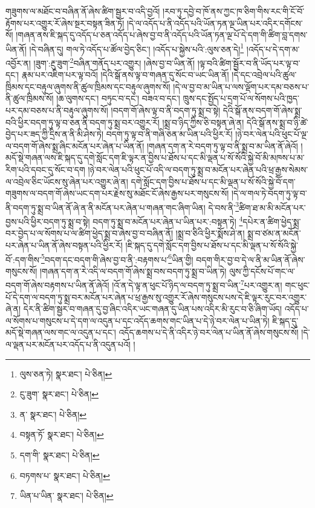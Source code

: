 གཟུགས་ལ་མཐོང་བ་བཞིན་ནོ་ཞེས་ཚིག་སྦྱར་བ་འདི་བྱའོ། །རབ་ཏུ་དབྱེ་བ་ཁོ་ནས་ཀྱང་ཁ་ཅིག་གིས་རང་གི་ངོ་བོ་རྟོགས་པར་འགྱུར་རོ་ཞེས་སྔར་བསྟན་ཟིན་ཏོ། །དེ་ལ་འདོད་པ་ནི་འདོད་པའི་ཡོན་ཏན་ལྔ་ཡིན་པར་འདིར་དགོངས་སོ། །གཞན་ནས་ཇི་སྐད་དུ་འདོད་པ་ཅན་འདོད་པ་ཞེས་བྱ་བ་ནི་འདོད་པའི་ཡོན་ཏན་ལྔ་པོ་དེ་དག་གི་ཚིག་བླ་དགས་ཡིན་ནོ། །དེ་བཞིན་དུ། གལ་ཏེ་འདོད་པ་ཚོལ་བྱེད་ཅིང་། །འདོད་པ་སྐྱེས་པའི་:ལུས་ཅན་དེ།\footnote{ལུས་ཅན་ཏེ།  སྣར་ཐང་།  པེ་ཅིན། } །འདོད་པ་དེ་དག་མ་འབྱོར་ན། །ཟུག་:རྔུ་ཟུག་\footnote{ངུ་ཟུག་  སྣར་ཐང་།  པེ་ཅིན། }བཞིན་གནོད་པར་འགྱུར། །ཞེས་བྱ་བ་ཡིན་ནོ། །ལྟ་བའི་ཚིག་སྦྱོར་བ་ནི་ཡོད་པར་ལྟ་བ་དང་། རྣམ་པར་འཇིག་པར་ལྟ་བའོ། །དེའི་སྒོ་ནས་ལྟ་བ་གཞན་དུ་སོང་བ་ཡང་ཡིན་ནོ། །དེ་དང་འབྲེལ་པའི་ཚུལ་ཁྲིམས་དང་བརྟུལ་ཞུགས་ནི་ཚུལ་ཁྲིམས་དང་བརྟུལ་ཞུགས་སོ། །དེ་ལ་བྱ་བ་མ་ཡིན་པ་ལས་ལྡོག་པར་དམ་བཅས་པ་ནི་ཚུལ་ཁྲིམས་སོ། །ཆ་ལུགས་དང་། བཏུང་བ་དང་། བཟའ་བ་དང་། ཁྲུས་དང་སྤྱོད་པ་དྲག་པོ་ལ་སོགས་པའི་ཁྱད་པར་དམ་བཅས་པ་ནི་བརྟུལ་ཞུགས་སོ། །བདག་གོ་ཞེས་ལྟ་བ་ནི་བདག་ཏུ་སྨྲ་བ་སྟེ། དེའི་སྒོ་ནས་བདག་གོ་ཞེས་སྨྲ་བའི་ཕྱིར་བདག་ཏུ་ལྟ་བ་ཅན་ནི་བདག་ཏུ་སྨྲ་བར་འགྱུར་རོ། །སྨྲ་བ་ཉིད་ཀྱིས་ཅི་བསྟན་ཞེ་ན། དེའི་སྒོ་ནས་སྨྲ་བ་ཉི་ཚེ་བྱེད་པར་ཟད་ཀྱི་དྲིས་ན་ནི་མི་ཤེས་ཏེ། བདག་ཏུ་ལྟ་བ་ནི་གཞི་ཅན་མ་ཡིན་པའི་ཕྱིར་རོ། །ཉེ་བར་ལེན་པའི་ཕུང་པོ་ལྔ་ལ་བདག་གོ་ཞེས་སྨྲ་ཞིང་མངོན་པར་ཞེན་པ་ཡིན་ནོ། །གཞན་དག་ན་རེ་བདག་ཏུ་ལྟ་བ་ནི་སྨྲ་བ་མ་ཡིན་ནོ་ཞེའོ། །མདོ་སྡེ་གཞན་ལས་ཇི་སྐད་དུ་དགེ་སློང་དག་ཇི་ལྟར་ན་བྱིས་པ་ཐོས་པ་དང་མི་ལྡན་པ་སོ་སོའི་སྐྱེ་བོ་མི་མཁས་པ་མ་རིག་པའི་དབང་དུ་སོང་བ་དག །ཉེ་བར་ལེན་པའི་ཕུང་པོ་འདི་ལ་བདག་ཏུ་སྨྲ་བ་མངོན་པར་ཞེན་པའི་ཕྲ་རྒྱས་སེམས་ལ་འབྲེལ་ཅིང་ཡོངས་སུ་ཞེན་པར་འགྱུར་ཞེ་ན། དགེ་སློང་དག་བྱིས་པ་ཐོས་པ་དང་མི་ལྡན་པ་སོ་སོའི་སྐྱེ་བོ་དག་གཟུགས་ལ་བདག་གོ་ཞེས་ཡང་དག་པར་རྗེས་སུ་མཐོང་ངོ་ཞེས་རྒྱས་པར་གསུངས་སོ། །དེ་ལ་གལ་ཏེ་བདག་ཏུ་ལྟ་བ་ནི་བདག་ཏུ་སྨྲ་བ་ཡིན་ནོ་ཞེ་ན་ནི་མངོན་པར་ཞེན་པ་གཞན་གང་ཞིག་ཡིན། དེ་བས་ནི་\footnote{ན་  སྣར་ཐང་།  པེ་ཅིན། }ཚིག་ཐ་མ་མི་མངོན་པར་བྱས་པའི་ཕྱིར་བདག་ཏུ་སྨྲ་བ་སྟེ། བདག་ཏུ་སྨྲ་བ་མངོན་པར་ཞེན་པ་ཡིན་པར་:བསྟན་ཏེ། \footnote{བསྟན་ཏོ་  སྣར་ཐང་།  པེ་ཅིན། }དཔེར་ན་ཚིག་ཕྱེད་སྨྲ་བར་བྱེད་པ་ལ་སོགས་པ་ལ་ཚིག་ཕྱེད་སྨྲ་བ་ཞེས་བྱ་བ་བཞིན་ནོ། །སྨྲ་བ་ཅིའི་ཕྱིར་སྨོས་ཤེ་ན། སྨྲ་བ་ཙམ་ན་མངོན་པར་ཞེན་པ་ཡིན་ནོ་ཞེས་བསྟན་པའི་ཕྱིར་རོ། །ཇི་སྐད་དུ་དགེ་སློང་དག་བྱིས་པ་ཐོས་པ་དང་མི་ལྡན་པ་སོ་སོའི་སྐྱེ་བོ་:དག་གིས་\footnote{དག་གི་  སྣར་ཐང་།  པེ་ཅིན། }བདག་དང་བདག་གི་ཞེས་བྱ་བ་ནི་:བརྟགས་པ་\footnote{བཏགས་པ་  སྣར་ཐང་།  པེ་ཅིན། }ཡིན་གྱི། བདག་གིར་བྱ་བ་དེ་ལ་ནི་མ་ཡིན་ནོ་ཞེས་གསུངས་སོ། །གཞན་དག་ན་རེ་འདི་ལ་བདག་གོ་ཞེས་སྨྲ་བས་བདག་ཏུ་སྨྲ་བ་ཡིན་ཏེ། ལུས་ཀྱི་དངོས་པོ་གང་ལ་བདག་གོ་ཞེས་བརྟགས་པ་ཡིན་ནོ་ཞེའོ། །འོ་ན་དེ་ལྟ་ན་ཕུང་པོ་ཉིད་ལ་བདག་ཏུ་སྨྲ་བ་ཡིན་\footnote{ཡིན་པ་ཡིན་  སྣར་ཐང་།  པེ་ཅིན། }པར་འགྱུར་ན། གང་ཕུང་པོ་དེ་དག་ལ་བདག་ཏུ་སྨྲ་བར་མངོན་པར་ཞེན་པ་ཕྲ་རྒྱས་སུ་འགྱུར་རོ་ཞེས་གསུངས་པས་དེ་ཇི་ལྟར་རུང་བར་འགྱུར་ཞེ་ན། དེར་ནི་ཚིག་སྦྱར་བ་གཞན་དུ་བྱ་ཞིང་འདིར་ཡང་གཞན་དུ་ཡིན་པས་འདིར་མི་རུང་བ་ཅི་ཞིག་ཡོད། འདོད་པ་ལ་སོགས་པ་གསུངས་པ་དེ་དག་ལ་འདུན་པ་དང་འདོད་ཆགས་གང་ཡིན་པ་དེ་ཉེ་བར་ལེན་པ་ཡིན་ཏེ། ཇི་སྐད་དུ་མདོ་སྡེ་གཞན་ལས་གང་ལ་འདུན་པ་དང་། འདོད་ཆགས་པ་དེ་ནི་འདིར་ཉེ་བར་ལེན་པ་ཡིན་ནོ་ཞེས་གསུངས་སོ། །དེ་ལ་ལྡན་པར་མངོན་པར་འདོད་པ་ནི་འདུན་པའོ། །
